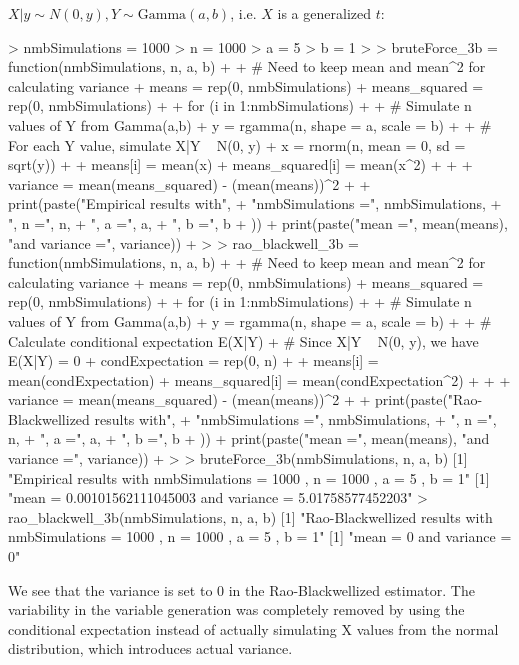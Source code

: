 \documentclass{article}
\begin{document}
{\(X | y \sim N(0, y), Y \sim \text{Gamma}(a, b)\), i.e. \(X\) is a generalized \(t\):
\begin{spverbatim}
> nmbSimulations = 1000
> n = 1000
> a = 5
> b = 1
> 
> bruteForce_3b = function(nmbSimulations, n, a, b) {
+   
+   # Need to keep mean and mean^2 for calculating variance
+   means = rep(0, nmbSimulations)
+   means_squared = rep(0, nmbSimulations)
+   
+   for (i in 1:nmbSimulations) {
+     
+     # Simulate n values of Y from Gamma(a,b)
+     y = rgamma(n, shape = a, scale = b)
+     
+     # For each Y value, simulate X|Y ~ N(0, y)
+     x = rnorm(n, mean = 0, sd = sqrt(y))
+     
+     means[i] = mean(x)
+     means_squared[i] = mean(x^2)
+   }
+   
+   variance = mean(means_squared) - (mean(means))^2
+   
+   print(paste("Empirical results with", 
+               "nmbSimulations =", nmbSimulations,
+               ", n =", n,
+               ", a =", a,
+               ", b =", b
+               ))
+   print(paste("mean =", mean(means), "and variance =", variance))
+ }
> 
> rao_blackwell_3b = function(nmbSimulations, n, a, b) {
+   
+   # Need to keep mean and mean^2 for calculating variance
+   means = rep(0, nmbSimulations)
+   means_squared = rep(0, nmbSimulations)
+   
+   for (i in 1:nmbSimulations) {
+     
+     # Simulate n values of Y from Gamma(a,b)
+     y = rgamma(n, shape = a, scale = b)
+     
+     # Calculate conditional expectation E(X|Y)
+     # Since X|Y ~ N(0, y), we have E(X|Y) = 0
+     condExpectation = rep(0, n)
+     
+     means[i] = mean(condExpectation)
+     means_squared[i] = mean(condExpectation^2)
+   }
+   
+   variance = mean(means_squared) - (mean(means))^2
+   
+   print(paste("Rao-Blackwellized results with", 
+               "nmbSimulations =", nmbSimulations,
+               ", n =", n,
+               ", a =", a,
+               ", b =", b
+   ))
+   print(paste("mean =", mean(means), "and variance =", variance))
+ }
> 
> bruteForce_3b(nmbSimulations, n, a, b)
[1] "Empirical results with nmbSimulations = 1000 , n = 1000 , a = 5 , b = 1"
[1] "mean = 0.00101562111045003 and variance = 5.01758577452203"
> rao_blackwell_3b(nmbSimulations, n, a, b)
[1] "Rao-Blackwellized results with nmbSimulations = 1000 , n = 1000 , a = 5 , b = 1"
[1] "mean = 0 and variance = 0"
\end{spverbatim}
We see that the variance is set to 0 in the Rao-Blackwellized estimator. The variability in the variable generation was completely removed by using the conditional expectation instead of actually simulating X values from the normal distribution, which introduces actual variance.

}
\end{document}
